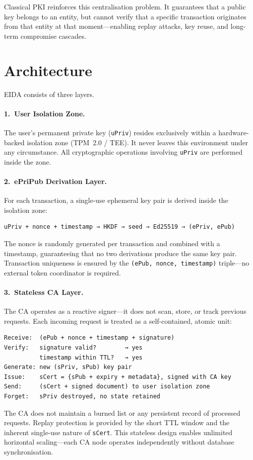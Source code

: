 \documentclass[11pt,a4paper]{article}
\begin{document}
Classical PKI reinforces this centralisation problem.  It guarantees that a
public key belongs to an entity, but cannot verify that a specific transaction
originates from that entity at that moment---enabling replay attacks, key
reuse, and long-term compromise cascades.

\section{Architecture}

EIDA consists of three layers.

\paragraph{1.~User Isolation Zone.}
The user's permanent private key (\texttt{uPriv}) resides exclusively within
a hardware-backed isolation zone (TPM~2.0 / TEE).  It never leaves this
environment under any circumstance.  All cryptographic operations involving
\texttt{uPriv} are performed inside the zone.

\paragraph{2.~ePriPub Derivation Layer.}
For each transaction, a single-use ephemeral key pair is derived inside the
isolation zone:
\begin{lstlisting}[style=protocol]
uPriv + nonce + timestamp → HKDF → seed → Ed25519 → (ePriv, ePub)
\end{lstlisting}
The nonce is randomly generated per transaction and combined with a
timestamp, guaranteeing that no two derivations produce the same key pair.
Transaction uniqueness is ensured by the \texttt{(ePub, nonce, timestamp)}
triple---no external token coordinator is required.

\paragraph{3.~Stateless CA Layer.}
The CA operates as a reactive signer---it does not scan, store, or track
previous requests.  Each incoming request is treated as a self-contained,
atomic unit:
\begin{lstlisting}[style=protocol]
Receive:  (ePub + nonce + timestamp + signature)
Verify:   signature valid?        → yes
          timestamp within TTL?   → yes
Generate: new (sPriv, sPub) key pair
Issue:    sCert = {sPub + expiry + metadata}, signed with CA key
Send:     (sCert + signed document) to user isolation zone
Forget:   sPriv destroyed, no state retained
\end{lstlisting}
The CA does not maintain a burned list or any persistent record of processed
requests.  Replay protection is provided by the short TTL window and the
inherent single-use nature of \texttt{sCert}.  This stateless design enables
unlimited horizontal scaling---each CA node operates independently without
database synchronisation.
\end{document}
